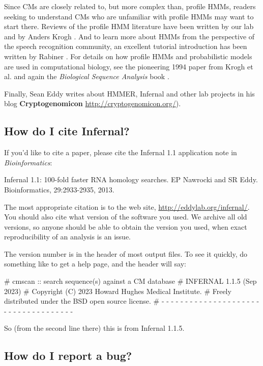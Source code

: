Since CMs are closely related to, but more complex than, profile HMMs,
readers seeking to understand CMs who are unfamiliar with profile HMMs
may want to start there.  Reviews of the profile HMM literature have
been written by our lab \citep{Eddy96,Eddy98} and by Anders Krogh
\citep{Krogh98}. And to learn more about HMMs from the perspective of
the speech recognition community, an excellent tutorial introduction
has been written by Rabiner \citep{Rabiner89}. For details on how
profile HMMs and probabilistic models are used in computational
biology, see the pioneering 1994 paper from Krogh et
al. \citep{Krogh94} and again the \emph{Biological Sequence Analysis}
book \citep{Durbin98}.

Finally, Sean Eddy writes about HMMER, Infernal and other lab projects in
his blog \textbf{Cryptogenomicon} \url{http://cryptogenomicon.org/}).

\subsection{How do I cite Infernal?}

If you'd like to cite a paper, please cite the Infernal 1.1 application
note in \emph{Bioinformatics}:

Infernal 1.1: 100-fold faster RNA homology searches.
EP Nawrocki and SR Eddy.
Bioinformatics, 29:2933-2935, 2013.

The most appropriate citation is to the web site,
\url{http://eddylab.org/infernal/}. You should also cite what version
of the software you used. We archive all old versions, so anyone
should be able to obtain the version you used, when exact
reproducibility of an analysis is an issue.

The version number is in the header of most output files. To see it
quickly, do something like  to get a help page, and
the header will say:

\begin{sreoutput}
# cmscan :: search sequence(s) against a CM database
# INFERNAL 1.1.5 (Sep 2023)
# Copyright (C) 2023 Howard Hughes Medical Institute.
# Freely distributed under the BSD open source license.
# - - - - - - - - - - - - - - - - - - - - - - - - - - - - - - - - - - - -
\end{sreoutput}

So (from the second line there) this is from Infernal 1.1.5.

\subsection{How do I report a bug?}

